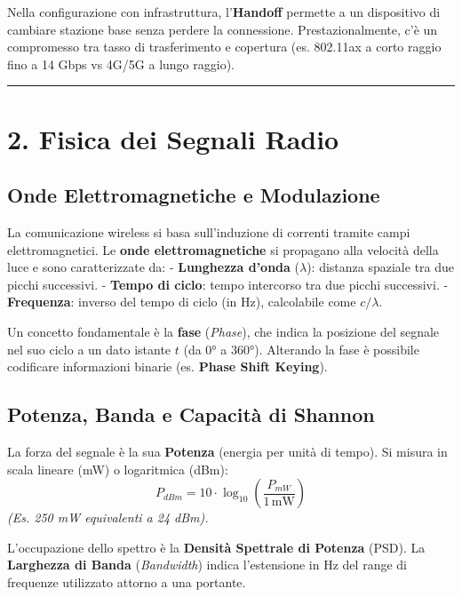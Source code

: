 \documentclass[
  italian,
  openany]{book}
\begin{document}
Nella configurazione con infrastruttura, l'\textbf{Handoff} permette a
un dispositivo di cambiare stazione base senza perdere la connessione.
Prestazionalmente, c'è un compromesso tra tasso di trasferimento e
copertura (es. 802.11ax a corto raggio fino a 14 Gbps vs 4G/5G a lungo
raggio).

\begin{center}\rule{0.5\linewidth}{0.5pt}\end{center}

\section{2. Fisica dei Segnali Radio}\label{fisica-dei-segnali-radio}

\subsection{Onde Elettromagnetiche e
Modulazione}\label{onde-elettromagnetiche-e-modulazione}

La comunicazione wireless si basa sull'induzione di correnti tramite
campi elettromagnetici. Le \textbf{onde elettromagnetiche} si propagano
alla velocità della luce e sono caratterizzate da: - \textbf{Lunghezza
d'onda} (\(\lambda\)): distanza spaziale tra due picchi successivi. -
\textbf{Tempo di ciclo}: tempo intercorso tra due picchi successivi. -
\textbf{Frequenza}: inverso del tempo di ciclo (in Hz), calcolabile come
\(c/\lambda\).

Un concetto fondamentale è la \textbf{fase} (\emph{Phase}), che indica
la posizione del segnale nel suo ciclo a un dato istante \(t\) (da 0° a
360°). Alterando la fase è possibile codificare informazioni binarie
(es. \textbf{Phase Shift Keying}).

\subsection{Potenza, Banda e Capacità di
Shannon}\label{potenza-banda-e-capacituxe0-di-shannon}

La forza del segnale è la sua \textbf{Potenza} (energia per unità di
tempo). Si misura in scala lineare (mW) o logaritmica (dBm):
\[P_{dBm}=10\cdot \log_{10}\left(\frac{P_{mW}}{1\,\text{mW}}\right)\]
\emph{(Es. 250 mW equivalenti a 24 dBm).}

L'occupazione dello spettro è la \textbf{Densità Spettrale di Potenza}
(PSD). La \textbf{Larghezza di Banda} (\emph{Bandwidth}) indica
l'estensione in Hz del range di frequenze utilizzato attorno a una
portante.
\end{document}
